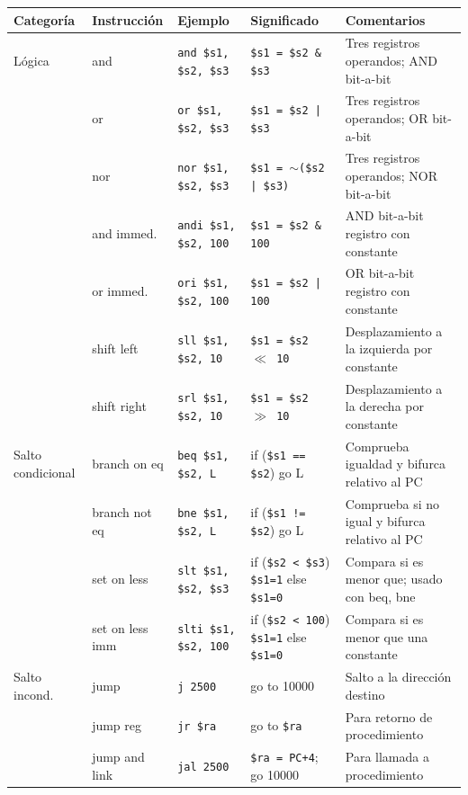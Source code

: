 \documentclass[12pt,a4paper]{article}
\begin{document}
	\begin{table}[H]
		\centering
		\small
		\begin{tabularx}{\textwidth}{>{\raggedright\arraybackslash}p{2.2cm} >{\raggedright\arraybackslash}p{2.2cm} >{\raggedright\arraybackslash}p{3cm} >{\raggedright\arraybackslash}p{3.5cm} X}
			\toprule
			\textbf{Categoría} & \textbf{Instrucción} & \textbf{Ejemplo} & \textbf{Significado} & \textbf{Comentarios} \\
			\midrule
			Lógica 
			& and & \texttt{and \$s1, \$s2, \$s3} & \texttt{\$s1 = \$s2 \& \$s3} & Tres registros operandos; AND bit-a-bit \\
			& or & \texttt{or \$s1, \$s2, \$s3} & \texttt{\$s1 = \$s2 | \$s3} & Tres registros operandos; OR bit-a-bit \\
			& nor & \texttt{nor \$s1, \$s2, \$s3} & \texttt{\$s1 = $\sim$(\$s2 | \$s3)} & Tres registros operandos; NOR bit-a-bit \\
			& and immed. & \texttt{andi \$s1, \$s2, 100} & \texttt{\$s1 = \$s2 \& 100} & AND bit-a-bit registro con constante \\
			& or immed. & \texttt{ori \$s1, \$s2, 100} & \texttt{\$s1 = \$s2 | 100} & OR bit-a-bit registro con constante \\
			& shift left & \texttt{sll \$s1, \$s2, 10} & \texttt{\$s1 = \$s2 $\ll$ 10} & Desplazamiento a la izquierda por constante \\
			& shift right & \texttt{srl \$s1, \$s2, 10} & \texttt{\$s1 = \$s2 $\gg$ 10} & Desplazamiento a la derecha por constante \\
			\midrule
			Salto condicional 
			& branch on eq & \texttt{beq \$s1, \$s2, L} & if (\texttt{\$s1 == \$s2}) go L & Comprueba igualdad y bifurca relativo al PC \\
			& branch not eq & \texttt{bne \$s1, \$s2, L} & if (\texttt{\$s1 != \$s2}) go L & Comprueba si no igual y bifurca relativo al PC \\
			& set on less & \texttt{slt \$s1, \$s2, \$s3} & if (\texttt{\$s2 < \$s3}) \texttt{\$s1=1} else \texttt{\$s1=0} & Compara si es menor que; usado con beq, bne \\
			& set on less imm & \texttt{slti \$s1, \$s2, 100}& if (\texttt{\$s2 < 100}) \texttt{\$s1=1} else \texttt{\$s1=0} & Compara si es menor que una constante \\
			\midrule
			Salto incond. 
			& jump & \texttt{j 2500} & go to 10000 & Salto a la dirección destino \\
			& jump reg & \texttt{jr \$ra} & go to \texttt{\$ra} & Para retorno de procedimiento \\
			& jump and link & \texttt{jal 2500} & \texttt{\$ra = PC+4}; go 10000 & Para llamada a procedimiento \\
			\bottomrule
		\end{tabularx}
	
	\end{table}
	
\end{document}
